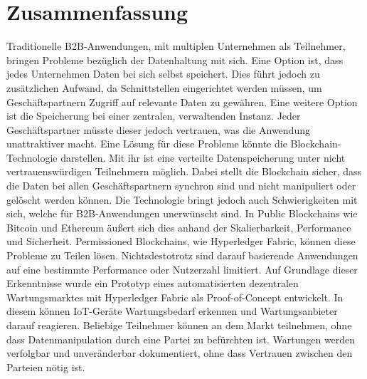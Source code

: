 \pagestyle{empty} %

\chapter*{Zusammenfassung} %
\label{cha:abtract}

Traditionelle B2B-Anwendungen, mit multiplen Unternehmen als Teilnehmer, bringen Probleme bezüglich der Datenhaltung mit sich. Eine Option ist, dass jedes Unternehmen Daten bei sich selbst speichert. Dies führt jedoch zu zusätzlichen Aufwand, da Schnittstellen eingerichtet werden müssen, um Geschäftspartnern Zugriff auf relevante Daten zu gewähren. Eine weitere Option ist die Speicherung bei einer zentralen, verwaltenden Instanz. Jeder Geschäftspartner müsste dieser jedoch vertrauen, was die Anwendung unattraktiver macht. Eine Lösung für diese Probleme könnte die Blockchain-Technologie darstellen. Mit ihr ist eine verteilte Datenspeicherung unter nicht vertrauenswürdigen Teilnehmern möglich. Dabei stellt die Blockchain sicher, dass die Daten bei allen Geschäftspartnern synchron sind und nicht manipuliert oder gelöscht werden können. Die Technologie bringt jedoch auch Schwierigkeiten mit sich, welche für B2B-Anwendungen unerwünscht sind. In Public Blockchains wie Bitcoin und Ethereum äußert sich dies anhand der Skalierbarkeit, Performance und Sicherheit. Permissioned Blockchains, wie Hyperledger Fabric, können diese Probleme zu Teilen lösen. Nichtsdestotrotz sind darauf basierende Anwendungen auf eine bestimmte Performance oder Nutzerzahl limitiert. Auf Grundlage dieser Erkenntnisse wurde ein Prototyp eines automatisierten dezentralen Wartungsmarktes mit Hyperledger Fabric als Proof-of-Concept entwickelt. In diesem können IoT-Geräte Wartungsbedarf erkennen und Wartungsanbieter darauf reagieren. Beliebige Teilnehmer können an dem Markt teilnehmen, ohne dass Datenmanipulation durch eine Partei zu befürchten ist. Wartungen werden verfolgbar und unveränderbar dokumentiert, ohne dass Vertrauen zwischen den Parteien nötig ist.
